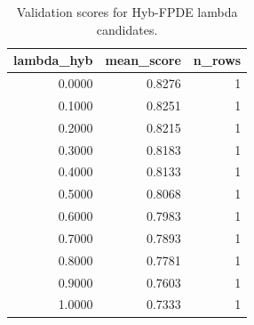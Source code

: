 \begin{table}[t]
\caption{Validation scores for Hyb-FPDE lambda candidates.}
\label{tab:lambda_distribution_computed}
\centering
\begin{tabular}{rrr}
\toprule
lambda\_hyb & mean\_score & n\_rows \\
\midrule
0.0000 & 0.8276 & 1 \\
0.1000 & 0.8251 & 1 \\
0.2000 & 0.8215 & 1 \\
0.3000 & 0.8183 & 1 \\
0.4000 & 0.8133 & 1 \\
0.5000 & 0.8068 & 1 \\
0.6000 & 0.7983 & 1 \\
0.7000 & 0.7893 & 1 \\
0.8000 & 0.7781 & 1 \\
0.9000 & 0.7603 & 1 \\
1.0000 & 0.7333 & 1 \\
\bottomrule
\end{tabular}

\end{table}
